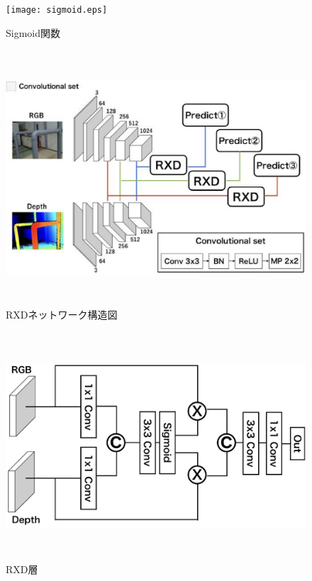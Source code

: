 \begin{figure}[htbt]
	\centering
	 \texttt{[image: sigmoid.eps]}
	 \caption{Sigmoid関数}
	 \label{fig:f2}
\end{figure}


\begin{figure}[htbt]
	\centering
	 \includegraphics[height=95mm]{rxdnet.eps}
	 \caption{RXDネットワーク構造図}
	 \label{fig:f2}
\end{figure}

\begin{figure}[htbt]
	\centering
	 \includegraphics[height=85mm]{RDXa.eps}
	 \caption{RXD層}
	 \label{fig:f2}
\end{figure}
\clearpage
